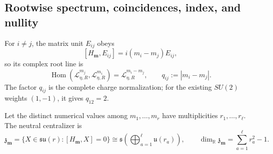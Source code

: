 \subsection{Rootwise spectrum, coincidences, index, and nullity}

For \(i\ne j\), the matrix unit \(E_{ij}\) obeys
\[
 [H_{\mathbf m},E_{ij}]=i(m_i-m_j)E_{ij},
\]
so its complex root line is
\begin{equation}
 \operatorname{Hom}(\mathscr L_{\eta,R}^{m_j},
                     \mathscr L_{\eta,R}^{m_i})
 =\mathscr L_{\eta,R}^{m_i-m_j},
 \qquad q_{ij}:=|m_i-m_j|.
 \label{cusp-native-full-flux-suN-root-charge}
\end{equation}
The factor \(q_{ij}\) is the complete charge normalization; for the existing
\(SU(2)\) weights \((1,-1)\), it gives \(q_{12}=2\).

Let the distinct numerical values among \(m_1,\ldots,m_r\) have
multiplicities \(r_1,\ldots,r_\ell\).  The neutral centralizer is
\begin{equation}
 \mathfrak z_{\mathbf m}
 =\{X\in\mathfrak{su}(r):[H_{\mathbf m},X]=0\}
 \cong\mathfrak s\!\left(\bigoplus_{a=1}^{\ell}\mathfrak u(r_a)\right),
 \qquad
 \dim_{\mathbb R}\mathfrak z_{\mathbf m}
 =\sum_{a=1}^{\ell}r_a^2-1.
 \label{cusp-native-full-flux-suN-centralizer}
\end{equation}

